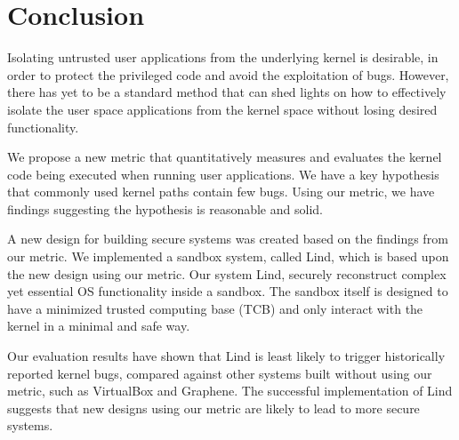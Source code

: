 \section{Conclusion}
\label{sec.conclusion}



Isolating untrusted user applications from the underlying kernel is
desirable, in order to protect the privileged code and 
avoid the exploitation of bugs. However, there has yet to be a standard
method that can shed lights on how to effectively
isolate the user space applications from the kernel space without losing
desired functionality.

We propose a new metric that quantitatively measures and evaluates the
kernel code being executed when running
user applications. We have a key hypothesis that commonly used kernel paths
contain few bugs. Using our metric, 
we have findings suggesting the hypothesis is reasonable and solid. 

A new design for building secure systems was created based on the findings
from our metric. 
We implemented a sandbox system, called Lind, which is based upon the new
design using our metric. 
Our system Lind, securely reconstruct complex yet essential OS
functionality inside a sandbox. 
The sandbox itself is designed to have a minimized trusted computing base
(TCB) and only interact with the kernel
in a minimal and safe way. 

Our evaluation results have shown that Lind is least likely to trigger
historically reported kernel bugs, compared against
other systems built without using our metric, such as VirtualBox and
Graphene. The successful implementation of Lind
suggests that new designs using our metric are likely to lead to more
secure systems. 
